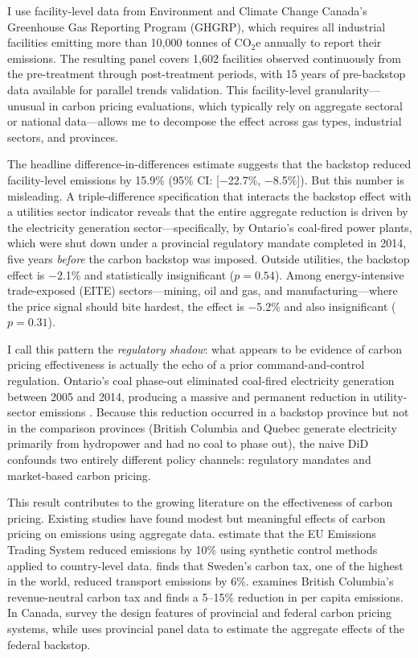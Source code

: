 \documentclass[12pt]{article}
\begin{document}
I use facility-level data from Environment and Climate Change Canada's Greenhouse Gas Reporting Program (GHGRP), which requires all industrial facilities emitting more than 10,000 tonnes of CO$_2$e annually to report their emissions. The resulting panel covers 1,602 facilities observed continuously from the pre-treatment through post-treatment periods, with 15 years of pre-backstop data available for parallel trends validation. This facility-level granularity---unusual in carbon pricing evaluations, which typically rely on aggregate sectoral or national data---allows me to decompose the effect across gas types, industrial sectors, and provinces.

The headline difference-in-differences estimate suggests that the backstop reduced facility-level emissions by 15.9\% (95\% CI: [$-$22.7\%, $-$8.5\%]). But this number is misleading. A triple-difference specification that interacts the backstop effect with a utilities sector indicator reveals that the entire aggregate reduction is driven by the electricity generation sector---specifically, by Ontario's coal-fired power plants, which were shut down under a provincial regulatory mandate completed in 2014, five years \textit{before} the carbon backstop was imposed. Outside utilities, the backstop effect is $-$2.1\% and statistically insignificant ($p = 0.54$). Among energy-intensive trade-exposed (EITE) sectors---mining, oil and gas, and manufacturing---where the price signal should bite hardest, the effect is $-$5.2\% and also insignificant ($p = 0.31$).

I call this pattern the \textit{regulatory shadow}: what appears to be evidence of carbon pricing effectiveness is actually the echo of a prior command-and-control regulation. Ontario's coal phase-out eliminated coal-fired electricity generation between 2005 and 2014, producing a massive and permanent reduction in utility-sector emissions \citep{river_dolter_2020}. Because this reduction occurred in a backstop province but not in the comparison provinces (British Columbia and Quebec generate electricity primarily from hydropower and had no coal to phase out), the naive DiD confounds two entirely different policy channels: regulatory mandates and market-based carbon pricing.

This result contributes to the growing literature on the effectiveness of carbon pricing. Existing studies have found modest but meaningful effects of carbon pricing on emissions using aggregate data. \citet{metcalf_stock_2023} estimate that the EU Emissions Trading System reduced emissions by 10\% using synthetic control methods applied to country-level data. \citet{andersson_2019} finds that Sweden's carbon tax, one of the highest in the world, reduced transport emissions by 6\%. \citet{yamazaki_2017} examines British Columbia's revenue-neutral carbon tax and finds a 5--15\% reduction in per capita emissions. In Canada, \citet{winter_rivers_2020} survey the design features of provincial and federal carbon pricing systems, while \citet{niu_2024} uses provincial panel data to estimate the aggregate effects of the federal backstop.
\end{document}
